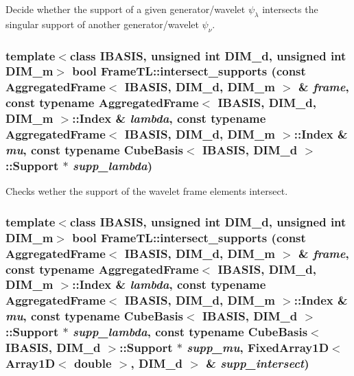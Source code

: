Decide whether the support of a given generator/wavelet $\psi_\lambda$ intersects the singular support of another generator/wavelet $\psi_\nu$. \hypertarget{namespaceFrameTL_0b6d3a80be9f0dd032527c3c17ce3f62}{
\subsubsection[intersect\_\-supports]{\setlength{\rightskip}{0pt plus 5cm}template$<$class IBASIS, unsigned int DIM\_\-d, unsigned int DIM\_\-m$>$ bool FrameTL::intersect\_\-supports (const AggregatedFrame$<$ IBASIS, DIM\_\-d, DIM\_\-m $>$ \& {\em frame}, \/  const typename AggregatedFrame$<$ IBASIS, DIM\_\-d, DIM\_\-m $>$::Index \& {\em lambda}, \/  const typename AggregatedFrame$<$ IBASIS, DIM\_\-d, DIM\_\-m $>$::Index \& {\em mu}, \/  const typename CubeBasis$<$ IBASIS, DIM\_\-d $>$::Support $\ast$ {\em supp\_\-lambda})}}
\label{namespaceFrameTL_0b6d3a80be9f0dd032527c3c17ce3f62}


Checks wether the support of the wavelet frame elements intersect. \hypertarget{namespaceFrameTL_5aeecded043a910b0dae7228883304b3}{
\subsubsection[intersect\_\-supports]{\setlength{\rightskip}{0pt plus 5cm}template$<$class IBASIS, unsigned int DIM\_\-d, unsigned int DIM\_\-m$>$ bool FrameTL::intersect\_\-supports (const AggregatedFrame$<$ IBASIS, DIM\_\-d, DIM\_\-m $>$ \& {\em frame}, \/  const typename AggregatedFrame$<$ IBASIS, DIM\_\-d, DIM\_\-m $>$::Index \& {\em lambda}, \/  const typename AggregatedFrame$<$ IBASIS, DIM\_\-d, DIM\_\-m $>$::Index \& {\em mu}, \/  const typename CubeBasis$<$ IBASIS, DIM\_\-d $>$::Support $\ast$ {\em supp\_\-lambda}, \/  const typename CubeBasis$<$ IBASIS, DIM\_\-d $>$::Support $\ast$ {\em supp\_\-mu}, \/  FixedArray1D$<$ Array1D$<$ double $>$, DIM\_\-d $>$ \& {\em supp\_\-intersect})}}
\label{namespaceFrameTL_5aeecded043a910b0dae7228883304b3}


